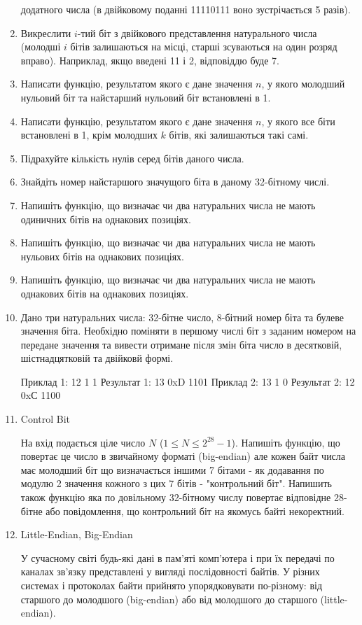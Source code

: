 \documentclass[]{article}
\begin{document}
\begin{enumerate}
  додатного числа (в двійковому поданні 11110111 воно зустрічається 5
  разів).
\item
  Викреслити $i$-тий біт з двійкового представлення натурального числа
  (молодші $i$ бітів залишаються на місці, старші зсуваються на один
  розряд вправо). Наприклад, якщо введені 11 і 2, відповіддю буде 7.
\item
  Написати функцію, результатом якого є дане значення $n$, у якого 
молодший нульовий біт та найстарший нульовий біт встановлені в 1.
\item
  Написати функцію, результатом якого є дане значення $n$, у якого все
  біти встановлені в 1, крім молодших $k$ бітів, які залишаються такі самі.
\item
  Підрахуйте кількість нулів серед бітів даного числа.
\item
  Знайдіть номер найстаршого значущого біта в даному 32-бітному числі.
\item
  Напишіть функцію, що визначає чи два натуральних числа не мають
  одиничних бітів на однакових позиціях.
\item
  Напишіть функцію, що визначає чи два натуральних числа не мають
  нульових бітів на однакових позиціях.
\item
  Напишіть функцію, що визначає чи два натуральних числа не мають
  однакових бітів на однакових позиціях.
\item
 Дано три натуральних числа: 32-бітне число, 8-бітний номер біта та булеве значення біта.
Необхідно поміняти в першому числі біт з заданим номером на передане значення та 
вивести отримане після змін біта число в десятковій, шістнадцятковій та двійковй формі.

Приклад 1: 
12 1 1 
Результат 1:
13 0xD 1101 
Приклад 2:
13 1 0
Результат 2:
12 0xС 1100

\item Control Bit

На вхід подається ціле число $N $ ($1\le N \le 2^{28}-1 $).
Напишіть функцію, що повертає це число в звичайному форматі (big-endian) але
кожен байт числа має молодший біт що визначається іншими 7 бітами -
як додавання по модулю 2 значення кожного з цих 7 бітів - "контрольний біт".
Напишить також функцію яка по довільному 32-бітному числу повертає відповідне 28-бітне
або повідомлення, що контрольний біт на якомусь байті некоректний.

\item

Little-Endian, Big-Endian

У сучасному світі будь-які дані в пам'яті комп'ютера і при їх передачі по каналах зв'язку представлені у вигляді послідовності байтів. У різних системах і протоколах байти прийнято упорядковувати по-різному: від старшого до молодшого (big-endian) або від молодшого до старшого (little-endian).


\end{enumerate}
\end{document}
